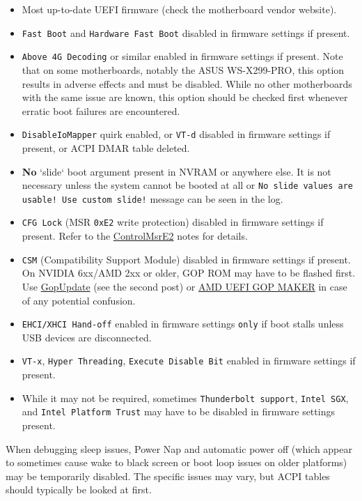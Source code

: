 \documentclass[]{article}
\providecommand{\tightlist}{%
  \setlength{\itemsep}{0pt}\setlength{\parskip}{0pt}}
\begin{document}
\begin{itemize}
\tightlist
\item Most up-to-date UEFI firmware (check the motherboard vendor website).
\item \texttt{Fast Boot} and \texttt{Hardware Fast Boot} disabled in firmware
  settings if present.
\item \texttt{Above 4G Decoding} or similar enabled in firmware
  settings if present. Note that on some motherboards, notably the ASUS WS-X299-PRO, this
  option results in adverse effects and must be disabled. While no other motherboards
  with the same issue are known, this option should be checked first whenever erratic boot
  failures are encountered.
\item \texttt{DisableIoMapper} quirk enabled, or \texttt{VT-d} disabled in
  firmware settings if present, or ACPI DMAR table deleted.
\item \textbf{No} `slide` boot argument present in NVRAM or anywhere else.
  It is not necessary unless the system cannot be booted at all or
  \texttt{No slide values are usable! Use custom slide!} message can be seen in the log.
\item \texttt{CFG Lock} (MSR \texttt{0xE2} write protection) disabled in
  firmware settings if present. Refer to the \hyperref[kernelpropsquirks]{ControlMsrE2}
  notes for details.
\item \texttt{CSM} (Compatibility Support Module) disabled in firmware settings
  if present. On NVIDIA 6xx/AMD 2xx or older, GOP ROM may have to be flashed first. Use
  \href{https://www.win-raid.com/t892f16-AMD-and-Nvidia-GOP-update-No-requests-DIY.html}{GopUpdate}
  (see the second post) or \href{http://www.insanelymac.com/forum/topic/299614-asus-eah6450-video-bios-uefi-gop-upgrade-and-gop-uefi-binary-in-efi-for-many-ati-cards/page-1#entry2042163}{AMD UEFI GOP MAKER}
  in case of any potential confusion.
\item \texttt{EHCI/XHCI Hand-off} enabled in firmware settings \texttt{only} if boot
  stalls unless USB devices are disconnected.
\item \texttt{VT-x}, \texttt{Hyper Threading}, \texttt{Execute Disable Bit} enabled
  in firmware settings if present.
\item While it may not be required, sometimes
  \texttt{Thunderbolt support}, \texttt{Intel SGX}, and \texttt{Intel Platform Trust}
  may have to be disabled in firmware settings present.
\end{itemize}

When debugging sleep issues, Power Nap and automatic power off (which appear to sometimes cause
wake to black screen or boot loop issues on older platforms) may be temporarily disabled.
The specific issues may vary, but ACPI tables should typically be looked at first.
\end{document}
